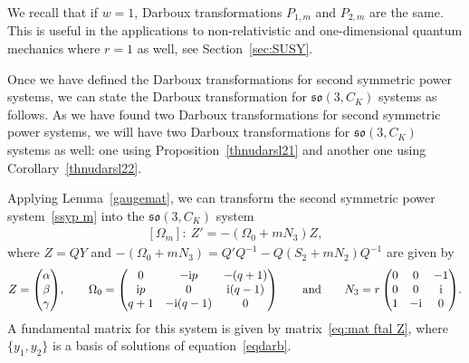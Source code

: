 \documentclass[pdftex]{sigma}%
\numberwithin{equation}{section}
\begin{document}
We recall that if $w=1$, Darboux transformations $P_{1,m}$ and $P_{2,m}$ are the same. This is useful in the applications to non-relativistic and one-dimensional quantum mechanics where $r=1$ as well, see Section~\ref{sec:SUSY}.

Once we have defined the Darboux transformations for second symmetric power systems, we can state the Darboux transformation for $\mathfrak{so}(3, C_K)$ systems as follows. As we have found two Darboux transformations for second symmetric power systems, we will have two Darboux transformations for $\mathfrak{so}(3, C_K)$ systems as well: one using Proposition~\ref{thnudarsl21} and another one using
Corollary~\ref{thnudarsl22}.

Applying Lemma~\ref{gaugemat}, we can transform the second symmetric power system~\eqref{ssyp m} into the $\mathfrak{so}(3, C_K)$ system
\begin{gather}\label{eq:system so3}
 [\Omega_m]\colon\ Z' = - (\Omega_0 + mN_3 ) Z,
\end{gather}
where $Z= Q Y$ and $- (\Omega_0 + mN_3 ) = Q' Q^{-1} - Q (S_2 + m N_2) Q^{-1} $ are given by
\begin{gather*}
Z= \begin{pmatrix}
	\alpha \\ \beta \\ \gamma \end{pmatrix}\!, \qquad
	\Omega_0=\begin{pmatrix}
	0&-{\rm i}p&-(q+1)\\ {\rm i}p&0&{\rm i}(q-1) \\ q+1&-{\rm i}(q-1)&0
	\end{pmatrix} \qquad \text{and} \qquad
	N_3 = r \begin{pmatrix} 0 & 0 & -1 \\ 0& 0& {\rm i} \\ 1 & -{\rm i} & 0 \end{pmatrix}\!.
\end{gather*}
A fundamental matrix for this system is given by matrix~\eqref{eq:mat ftal Z}, where $\{y_1, y_2\}$ is a basis of solutions of equation~\eqref{eqdarb}.
\end{document}
